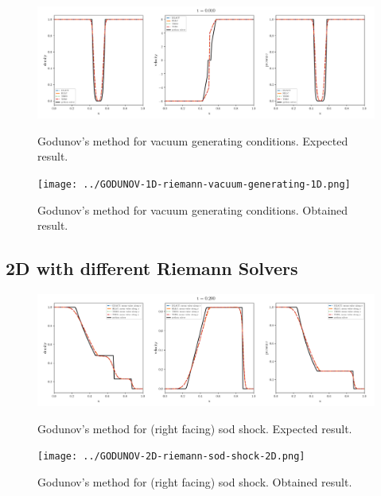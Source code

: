     \begin{figure}[htbp]
        \centering
        \includegraphics[width=.9\textwidth]{./figures/GODUNOV-riemann-vacuum-generating-1D.png}%
        \caption{Godunov's method for vacuum generating conditions. Expected result.}
        \texttt{[image: ../GODUNOV-1D-riemann-vacuum-generating-1D.png]}%
        \caption{Godunov's method for vacuum generating conditions. Obtained result.}
    \end{figure}








\clearpage
\subsection{2D with different Riemann Solvers}

    \begin{figure}[htbp]
        \centering
        \includegraphics[width=.9\textwidth]{./figures/GODUNOV-riemann-sod-shock-2D.png}%
        \caption{Godunov's method for (right facing) sod shock. Expected result.}
        \texttt{[image: ../GODUNOV-2D-riemann-sod-shock-2D.png]}%
        \caption{Godunov's method for (right facing) sod shock. Obtained result.}
    \end{figure}


